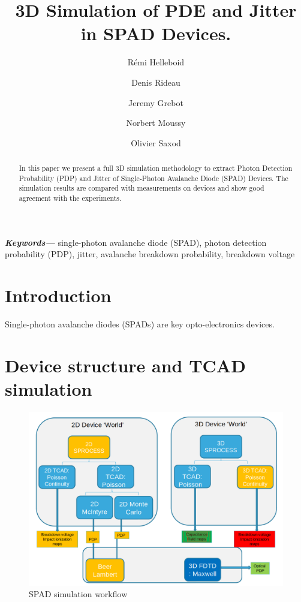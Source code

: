 \documentclass[11pt,a4paper,twocolumn]{article}
\title{3D Simulation of PDE and Jitter in SPAD Devices.}
\author[1]{Rémi Helleboid}
\author[1]{Denis Rideau}
\author[1]{Jeremy Grebot}
\author[2]{Norbert Moussy}
\author[2]{Olivier Saxod}
\affil[1]{ST Microelectronics, Crolles, France}
\affil[2]{CEA LETI, Grenoble, France}
\date{}                     %
\providecommand{\keywords}[1]
{
  \small	
  \textbf{\textit{Keywords---}} #1
}
\begin{document}
\maketitle

\begin{abstract}
In this paper we present a full 3D simulation methodology to extract Photon Detection Probability (PDP) and Jitter of Single-Photon Avalanche Diode (SPAD) Devices. The simulation results are compared with measurements on devices and show good agreement with the experiments.\\
\end{abstract}

\keywords{single-photon avalanche diode (SPAD), photon detection probability (PDP), jitter, avalanche breakdown probability, breakdown voltage}

\section{Introduction}
Single-photon avalanche diodes (SPADs) are key opto-electronics devices.


\section{Device structure and TCAD simulation}
\begin{figure}[hbtp]
\caption{SPAD simulation workflow}
\centering
\includegraphics[scale=0.21]{../pictures/TCADWorkflow.png}
\end{figure}
\end{document}
